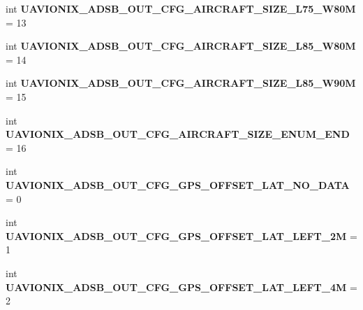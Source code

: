 \begin{DoxyCompactItemize}
\item 
\mbox{\label{namespacepymavlink_1_1dialects_1_1v10_a75786af28568b0e2bd274aa6194af6f4}} 
int {\bfseries U\+A\+V\+I\+O\+N\+I\+X\+\_\+\+A\+D\+S\+B\+\_\+\+O\+U\+T\+\_\+\+C\+F\+G\+\_\+\+A\+I\+R\+C\+R\+A\+F\+T\+\_\+\+S\+I\+Z\+E\+\_\+\+L75\+\_\+\+W80M} = 13
\item 
\mbox{\label{namespacepymavlink_1_1dialects_1_1v10_a45f01e11efcb8b3e9be497d7805c9a98}} 
int {\bfseries U\+A\+V\+I\+O\+N\+I\+X\+\_\+\+A\+D\+S\+B\+\_\+\+O\+U\+T\+\_\+\+C\+F\+G\+\_\+\+A\+I\+R\+C\+R\+A\+F\+T\+\_\+\+S\+I\+Z\+E\+\_\+\+L85\+\_\+\+W80M} = 14
\item 
\mbox{\label{namespacepymavlink_1_1dialects_1_1v10_a0cce5991fbf32ccdf6d3f7d32dceee02}} 
int {\bfseries U\+A\+V\+I\+O\+N\+I\+X\+\_\+\+A\+D\+S\+B\+\_\+\+O\+U\+T\+\_\+\+C\+F\+G\+\_\+\+A\+I\+R\+C\+R\+A\+F\+T\+\_\+\+S\+I\+Z\+E\+\_\+\+L85\+\_\+\+W90M} = 15
\item 
\mbox{\label{namespacepymavlink_1_1dialects_1_1v10_a1dc70fd9653f6d99b602e2bb2be5ea81}} 
int {\bfseries U\+A\+V\+I\+O\+N\+I\+X\+\_\+\+A\+D\+S\+B\+\_\+\+O\+U\+T\+\_\+\+C\+F\+G\+\_\+\+A\+I\+R\+C\+R\+A\+F\+T\+\_\+\+S\+I\+Z\+E\+\_\+\+E\+N\+U\+M\+\_\+\+E\+ND} = 16
\item 
\mbox{\label{namespacepymavlink_1_1dialects_1_1v10_a8160c214f21a621dd8c173e58bbeac6f}} 
int {\bfseries U\+A\+V\+I\+O\+N\+I\+X\+\_\+\+A\+D\+S\+B\+\_\+\+O\+U\+T\+\_\+\+C\+F\+G\+\_\+\+G\+P\+S\+\_\+\+O\+F\+F\+S\+E\+T\+\_\+\+L\+A\+T\+\_\+\+N\+O\+\_\+\+D\+A\+TA} = 0
\item 
\mbox{\label{namespacepymavlink_1_1dialects_1_1v10_aa026681863536ff3673c5049ff143218}} 
int {\bfseries U\+A\+V\+I\+O\+N\+I\+X\+\_\+\+A\+D\+S\+B\+\_\+\+O\+U\+T\+\_\+\+C\+F\+G\+\_\+\+G\+P\+S\+\_\+\+O\+F\+F\+S\+E\+T\+\_\+\+L\+A\+T\+\_\+\+L\+E\+F\+T\+\_\+2M} = 1
\item 
\mbox{\label{namespacepymavlink_1_1dialects_1_1v10_a89dd2ea1eb4eaa44a52ad5694b805216}} 
int {\bfseries U\+A\+V\+I\+O\+N\+I\+X\+\_\+\+A\+D\+S\+B\+\_\+\+O\+U\+T\+\_\+\+C\+F\+G\+\_\+\+G\+P\+S\+\_\+\+O\+F\+F\+S\+E\+T\+\_\+\+L\+A\+T\+\_\+\+L\+E\+F\+T\+\_\+4M} = 2

\end{DoxyCompactItemize}
